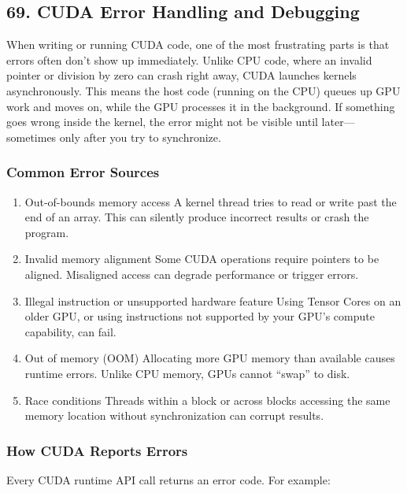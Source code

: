 \documentclass[
  letterpaper,
  DIV=11,
  numbers=noendperiod]{scrreprt}
\begin{document}
\subsection{69. CUDA Error Handling and
Debugging}\label{cuda-error-handling-and-debugging}

When writing or running CUDA code, one of the most frustrating parts is
that errors often don't show up immediately. Unlike CPU code, where an
invalid pointer or division by zero can crash right away, CUDA launches
kernels asynchronously. This means the host code (running on the CPU)
queues up GPU work and moves on, while the GPU processes it in the
background. If something goes wrong inside the kernel, the error might
not be visible until later---sometimes only after you try to
synchronize.

\subsubsection{Common Error Sources}\label{common-error-sources}

\begin{enumerate}
\def\labelenumi{\arabic{enumi}.}
\item
  Out-of-bounds memory access A kernel thread tries to read or write
  past the end of an array. This can silently produce incorrect results
  or crash the program.
\item
  Invalid memory alignment Some CUDA operations require pointers to be
  aligned. Misaligned access can degrade performance or trigger errors.
\item
  Illegal instruction or unsupported hardware feature Using Tensor Cores
  on an older GPU, or using instructions not supported by your GPU's
  compute capability, can fail.
\item
  Out of memory (OOM) Allocating more GPU memory than available causes
  runtime errors. Unlike CPU memory, GPUs cannot ``swap'' to disk.
\item
  Race conditions Threads within a block or across blocks accessing the
  same memory location without synchronization can corrupt results.
\end{enumerate}

\subsubsection{How CUDA Reports Errors}\label{how-cuda-reports-errors}

Every CUDA runtime API call returns an error code. For example:
\end{document}

